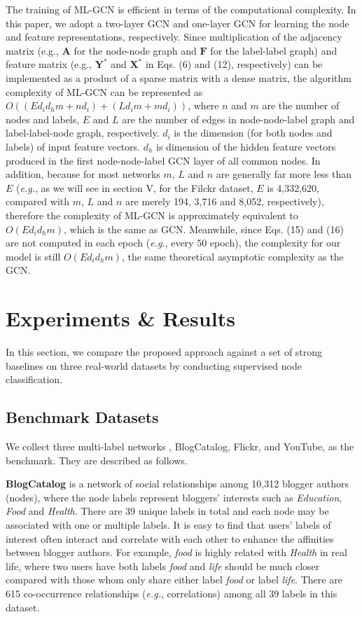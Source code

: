 \documentclass[conference]{IEEEtran}
\begin{document}
The training of ML-GCN is efficient in terms of the computational complexity. In this paper, we adopt a two-layer GCN and one-layer GCN for learning the node and feature representations, respectively. Since multiplication of the adjacency matrix (e.g., $\mathbf{A}$ for the node-node graph and $\mathbf{F}$ for the label-label graph) and feature matrix (e.g., $\mathbf{Y}^{*}$ and $\mathbf{X}^{*}$ in Eqs. (6) and (12), respectively) can be implemented as a product of a sparse matrix with a dense matrix, the algorithm complexity of ML-GCN can be represented as $O((Ed_id_hm+nd_i)+(Ld_im+md_i))$, where $n$ and $m$ are the number of nodes and labels, $E$ and $L$ are the number of edges in node-node-label graph and label-label-node graph, respectively. $d_i$ is the dimension (for both nodes and labels) of input feature vectors. $d_h$ is dimension of the hidden feature vectors produced in the first node-node-label GCN layer of all common nodes. In addition, because for most networks  $m$, $L$ and $n$ are generally far more less than $E$ (\textit{e.g.}, as we will see in section V, for the Filckr dataset, $E$ is 4,332,620, compared with $m$, $L$ and $n$ are merely 194, 3,716 and 8,052, respectively), therefore the complexity of ML-GCN is approximately equivalent to $O(Ed_id_hm)$, which is the same as GCN. Meanwhile, since Eqs. (15) and (16) are not computed in each epoch (\textit{e.g.}, every 50 epoch), the complexity for our model is still $O(Ed_id_hm)$, the same theoretical asymptotic complexity as the GCN.

\section{Experiments \& Results}
In this section, we compare the proposed approach against a set of strong baselines on three real-world datasets by conducting supervised node classification.

\subsection{Benchmark Datasets}
We collect three multi-label networks \cite{12,21}, BlogCatalog, Flickr, and YouTube, as the benchmark. They are described as follows.

\textbf{BlogCatalog} is a network of social relationships among 10,312 blogger authors (nodes), where the node labels represent bloggers' interests such as \textit{Education}, \textit{Food} and \textit{Health}. There are 39 unique labels in total and each node may be associated with one or multiple labels. It is easy to find that users' labels of interest often interact and correlate with each other to enhance the affinities between blogger authors. For example, \textit{food} is highly related with \textit{Health} in real life, where two users have both labels \textit{food} and \textit{life} should be much closer compared with those whom only share either label \textit{food} or label \textit{life}. There are 615 co-occurrence relationships (\textit{e.g.}, correlations) among all 39 labels in this dataset.
\end{document}
